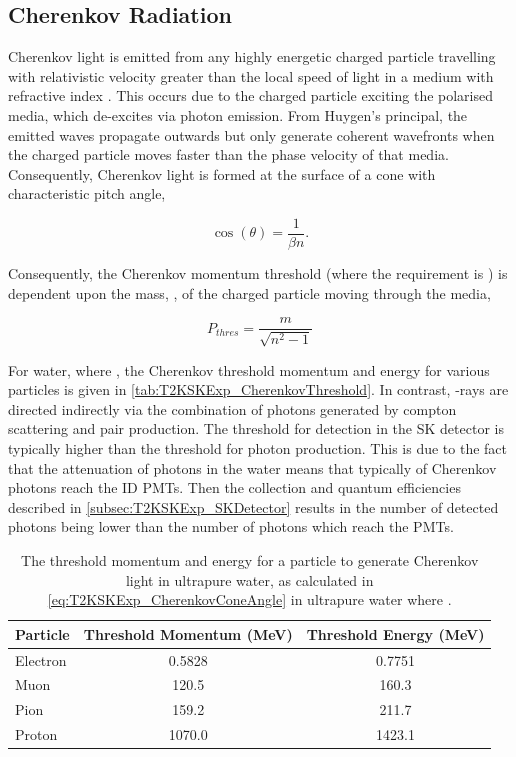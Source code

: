 \subsection{Cherenkov Radiation}
\label{subsec:T2KSKExp_Cherenkov}

Cherenkov light is emitted from any highly energetic charged particle travelling with relativistic velocity \quickmath{\beta} greater than the local speed of light in a medium with refractive index  \cite{Cerenkov1937-tl}. This occurs due to the charged particle exciting the polarised media, which de-excites via photon emission. From Huygen's principal, the emitted waves propagate outwards but only generate coherent wavefronts when the charged particle moves faster than the phase velocity of that media. Consequently, Cherenkov light is formed at the surface of a cone with characteristic pitch angle,

\begin{equation}
  \label{eq:T2KSKExp_CherenkovConeAngle}
  \cos(\theta)=\frac{1}{\beta n}.
\end{equation}

Consequently, the Cherenkov momentum threshold (where the requirement is ) is dependent upon the mass, , of the charged particle moving through the media,

\begin{equation}
  P_{thres} = \frac{m}{\sqrt{n^{2}-1}}
\end{equation}

For water, where , the Cherenkov threshold momentum and energy for various particles is given in \autoref{tab:T2KSKExp_CherenkovThreshold}. In contrast, \quickmath{\gamma}-rays are directed indirectly via the combination of photons generated by compton scattering and pair production. The threshold for detection in the SK detector is typically higher than the threshold for photon production. This is due to the fact that the attenuation of photons in the water means that typically  of Cherenkov photons reach the ID PMTs. Then the collection and quantum efficiencies described in \autoref{subsec:T2KSKExp_SKDetector} results in the number of detected photons being lower than the number of photons which reach the PMTs. 

\begin{table}[ht!]
    \centering
    \begin{tabular}{l|c|c}
      \hline
      Particle & Threshold Momentum (MeV) & Threshold Energy (MeV)\\
      \hline
      Electron & 0.5828 & 0.7751 \\
      Muon & 120.5 & 160.3 \\
      Pion & 159.2 & 211.7 \\
      Proton & 1070.0 & 1423.1 \\
      \hline
      \hline
    \end{tabular}
    \caption{The threshold momentum and energy for a particle to generate Cherenkov light in ultrapure water, as calculated in \autoref{eq:T2KSKExp_CherenkovConeAngle} in ultrapure water where .}
    \label{tab:T2KSKExp_CherenkovThreshold}
\end{table}

